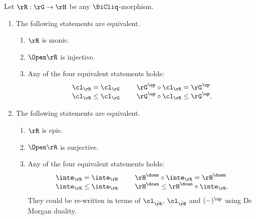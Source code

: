 \documentclass{article}
\begin{document}
\begin{lemma}
\label{lem:bicliq_mono_epi_char}
Let $\rR : \rG \to \rH$ be any $\BiCliq$-morphism.
\begin{enumerate}
\item
The following statements are equivalent.
\begin{enumerate}
\item $\rR$ is monic.
\item $\Open\rR$ is injective.
\item Any of the four equivalent statements holds:
\[
\begin{tabular}{lcl}
$\cl_\rR = \cl_\rG$ && $\rG^\up \circ \cl_\rR = \rG^\up$
\\
$\cl_\rR \leq \cl_\rG$ && $\rG^\up \circ \cl_\rR \leq \rG^\up$.
\end{tabular}
\]
\end{enumerate}
\item The following statements are equivalent.
\begin{enumerate}
\item $\rR$ is epic.
\item $\Open\rR$ is surjective.
\item Any of the four equivalent statements holds:
\[
\begin{tabular}{lcl}
$\inte_\rR = \inte_\rH$
&& $\rH^\down \circ \inte_\rR = \rH^\down$
\\
$\inte_\rH \leq \inte_\rR$
&& $\rH^\down \leq \rH^\down \circ \inte_\rR$.
\end{tabular}
\]
They could be re-written in terms of $\cl_{\breve{\rR}}$, $\cl_{\breve{\rH}}$ and $(-)^\up$ using De Morgan duality.
\end{enumerate}

\end{enumerate}
\end{lemma}
\end{document}
